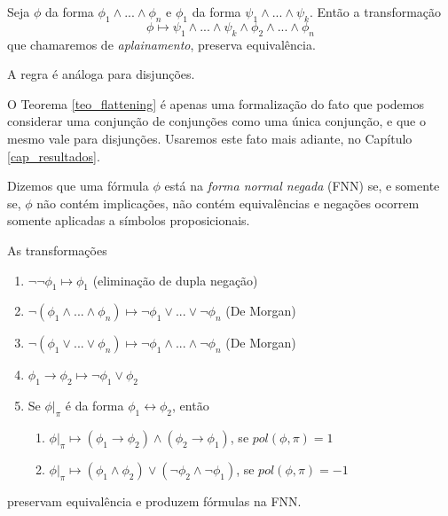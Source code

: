 \begin{theorem}
	\label{teo_flattening}
	Seja $\phi$ da forma $\phi_1 \wedge ... \wedge \phi_n$ e $\phi_1$ da forma $\psi_1 \wedge ... \wedge \psi_k$. Então a transformação $$\phi \longmapsto \psi_1 \wedge ... \wedge \psi_k \wedge \phi_2 \wedge ... \wedge \phi_n$$ que chamaremos de \emph{aplainamento}, preserva equivalência.
	
	A regra é análoga para disjunções.
\end{theorem}

O Teorema \ref{teo_flattening} é apenas uma formalização do fato que podemos considerar uma conjunção de conjunções como uma única conjunção, e que o mesmo vale para disjunções. Usaremos este fato mais adiante, no Capítulo \ref{cap_resultados}.

\begin{definition}
    Dizemos que uma fórmula $\phi$ está na \emph{forma normal negada} (FNN) se, e somente se, $\phi$ não contém implicações, não contém equivalências e negações ocorrem somente aplicadas a símbolos proposicionais.
\end{definition}

\begin{theorem}
    \label{fnn_theorem}
    As transformações
    \begin{enumerate}
        \item $\neg \neg \phi_1 \longmapsto \phi_1$ (eliminação de dupla negação)
        \item $\neg(\phi_1 \wedge ... \wedge \phi_n) \longmapsto \neg \phi_1 \vee ... \vee \neg \phi_n$ (De Morgan)
        \item $\neg(\phi_1 \vee ... \vee \phi_n) \longmapsto \neg \phi_1 \wedge ... \wedge \neg \phi_n$ (De Morgan)
        \item $\phi_1 \rightarrow \phi_2 \longmapsto \neg \phi_1 \vee \phi_2$
        \item Se $\phi|_\pi$ é da forma $\phi_1 \leftrightarrow \phi_2$, então
        \begin{enumerate}
        	\item $\phi|_\pi \longmapsto (\phi_1 \rightarrow \phi_2) \wedge (\phi_2 \rightarrow \phi_1)$, se $pol(\phi,\pi) = 1$
        	\item $\phi|_\pi \longmapsto (\phi_1 \wedge \phi_2) \vee (\neg \phi_2 \wedge \neg \phi_1)$, se $pol(\phi,\pi) = -1$
        \end{enumerate}
    \end{enumerate}
    preservam equivalência e produzem fórmulas na FNN.
\end{theorem}


